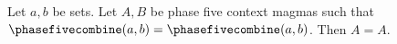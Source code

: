 

\begin{proposition}\label{notion_structure_grouped_ambiguous}
    Let $a,b$ be sets.
    Let $A,B$ be phase five context magmas such that
        $\phasefivecombine(a,b)=\phasefivecombine(a,b)$.
    Then $A=A$.
\end{proposition}
